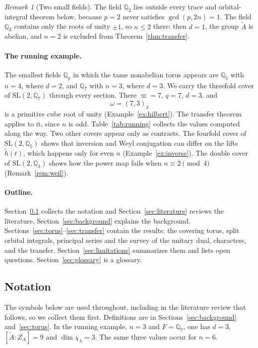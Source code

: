 \documentclass[12pt,letterpaper]{article}
\numberwithin{equation}{section}
\theoremstyle{plain}
\theoremstyle{definition}
\theoremstyle{remark}
\newtheorem{remark}[theorem]{Remark}
\newcommand{\At}{\widetilde A}
\newcommand{\hl}{\tilde h}
\newcommand{\Qq}{\mathbb Q}
\newcommand{\ZA}{Z_A}
\newcommand{\SL}{\mathrm{SL}}
\begin{document}
\begin{remark}[Two small fields]\label{rem:small-fields}
The field $\Qq_2$ lies outside every trace and orbital-integral theorem
below, because $p=2$ never satisfies $\gcd(p,2n)=1$. The field $\Qq_3$
contains only the roots of unity $\pm1$, so $n\le2$ there: then $d=1$,
the group $\At$ is abelian, and $n=2$ is excluded from
Theorem~\ref{thm:transfer}.
\end{remark}

\paragraph{The running example.} The smallest fields $\Qq_p$ in which
the tame nonabelian torus appears are $\Qq_5$ with $n=4$, where $d=2$,
and $\Qq_7$ with $n=3$, where $d=3$. We carry the threefold cover of
$\SL(2,\Qq_7)$ through every section. There $\varpi=7$, $q=7$, $d=3$,
and
\[
\omega=(7,3)_3
\]
is a primitive cube root of unity (Example~\ref{ex:hilbert}). The
transfer theorem applies to it, since $n$ is odd.
Table~\ref{tab:running} collects the values computed along the way. Two
other covers appear only as contrasts. The fourfold cover of
$\SL(2,\Qq_5)$ shows that inversion and Weyl conjugation can differ on
the lifts $\hl(t)$, which happens only for even $n$
(Example~\ref{ex:inverse}). The double cover of $\SL(2,\Qq_3)$ shows how
the power map fails when $n\equiv2\pmod4$ (Remark~\ref{rem:weil}).

\paragraph{Outline.} Section~\ref{sec:notation} collects the notation
and Section~\ref{sec:literature} reviews the literature.
Section~\ref{sec:background} explains the background.
Sections~\ref{sec:torus}--\ref{sec:transfer} contain the results:
the covering torus, split orbital integrals, principal series and the
survey of the unitary dual, characters, and the transfer.
Section~\ref{sec:limitations} summarizes them and lists open
questions. Section~\ref{sec:glossary} is a glossary.

\subsection{Notation}\label{sec:notation}
The symbols below are used throughout, including in the literature
review that follows, so we collect them first. Definitions are in
Sections~\ref{sec:background} and~\ref{sec:torus}. In the running
example, $n=3$ and $F=\Qq_7$, one has $d=3$, $[\At:\ZA]=9$ and
$\dim\chi_\lambda=3$. The same three values occur for $n=6$.
\end{document}
